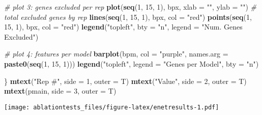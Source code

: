 \documentclass[]{article}
\newenvironment{Shaded}{\begin{snugshade}}{\end{snugshade}}
\newcommand{\CommentTok}[1]{\textcolor[rgb]{0.56,0.35,0.01}{\textit{#1}}}
\newcommand{\DataTypeTok}[1]{\textcolor[rgb]{0.13,0.29,0.53}{#1}}
\newcommand{\DecValTok}[1]{\textcolor[rgb]{0.00,0.00,0.81}{#1}}
\newcommand{\KeywordTok}[1]{\textcolor[rgb]{0.13,0.29,0.53}{\textbf{#1}}}
\newcommand{\NormalTok}[1]{#1}
\newcommand{\StringTok}[1]{\textcolor[rgb]{0.31,0.60,0.02}{#1}}
\begin{document}
\begin{Shaded}
\begin{Highlighting}[]
\CommentTok{# plot 3: genes excluded per rep}
\KeywordTok{plot}\NormalTok{(}\KeywordTok{seq}\NormalTok{(}\DecValTok{1}\NormalTok{, }\DecValTok{15}\NormalTok{, }\DecValTok{1}\NormalTok{), bpx, }\DataTypeTok{xlab =} \StringTok{""}\NormalTok{, }\DataTypeTok{ylab =} \StringTok{""}\NormalTok{) }\CommentTok{# total excluded genes by rep}
\KeywordTok{lines}\NormalTok{(}\KeywordTok{seq}\NormalTok{(}\DecValTok{1}\NormalTok{, }\DecValTok{15}\NormalTok{, }\DecValTok{1}\NormalTok{), bpx, }\DataTypeTok{col =} \StringTok{"red"}\NormalTok{)}
\KeywordTok{points}\NormalTok{(}\KeywordTok{seq}\NormalTok{(}\DecValTok{1}\NormalTok{, }\DecValTok{15}\NormalTok{, }\DecValTok{1}\NormalTok{), bpx, }\DataTypeTok{col =} \StringTok{"red"}\NormalTok{)}
\KeywordTok{legend}\NormalTok{(}\StringTok{"topleft"}\NormalTok{, }\DataTypeTok{bty =} \StringTok{"n"}\NormalTok{, }\DataTypeTok{legend =} \StringTok{"Num. Genes Excluded"}\NormalTok{)}

\CommentTok{# plot 4: features per model}
\KeywordTok{barplot}\NormalTok{(bpm, }\DataTypeTok{col =} \StringTok{"purple"}\NormalTok{, }\DataTypeTok{names.arg =} \KeywordTok{paste0}\NormalTok{(}\KeywordTok{seq}\NormalTok{(}\DecValTok{1}\NormalTok{, }\DecValTok{15}\NormalTok{, }\DecValTok{1}\NormalTok{)))}
\KeywordTok{legend}\NormalTok{(}\StringTok{"topleft"}\NormalTok{, }\DataTypeTok{legend =} \StringTok{"Genes per Model"}\NormalTok{, }\DataTypeTok{bty =} \StringTok{"n"}\NormalTok{)}

\NormalTok{\}}
\KeywordTok{mtext}\NormalTok{(}\StringTok{"Rep #"}\NormalTok{, }\DataTypeTok{side =} \DecValTok{1}\NormalTok{, }\DataTypeTok{outer =}\NormalTok{ T)}
\KeywordTok{mtext}\NormalTok{(}\StringTok{"Value"}\NormalTok{, }\DataTypeTok{side =} \DecValTok{2}\NormalTok{, }\DataTypeTok{outer =}\NormalTok{ T)}
\KeywordTok{mtext}\NormalTok{(pmain, }\DataTypeTok{side =} \DecValTok{3}\NormalTok{, }\DataTypeTok{outer =}\NormalTok{ T)}
\end{Highlighting}
\end{Shaded}

\texttt{[image: ablationtests\_files/figure-latex/enetresults-1.pdf]}
\end{document}
